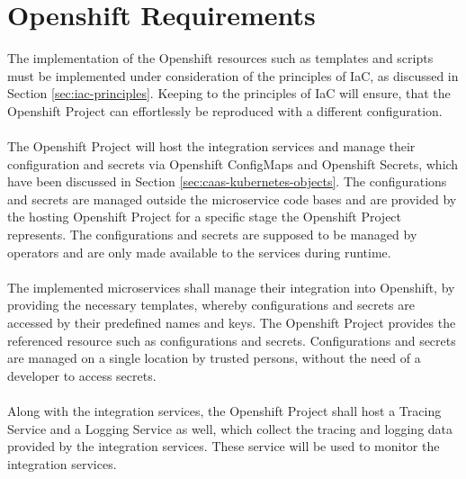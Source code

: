 \section{Openshift Requirements}
\label{sec:esboc-requirements-oc}
The implementation of the Openshift resources such as templates and scripts must be implemented under consideration of the principles of IaC, as discussed in Section \vref{sec:iac-principles}. Keeping to the principles of IaC will ensure, that the Openshift Project can effortlessly be reproduced with a different configuration.  
\\ \\
The Openshift Project will host the integration services and manage their configuration and secrets via Openshift ConfigMaps and Openshift Secrets, which have been discussed in Section \vref{sec:caas-kubernetes-objects}. The configurations and secrets are managed outside the microservice code bases and are provided by the hosting Openshift Project for a specific stage the Openshift Project represents. The configurations and secrets are supposed to be managed by operators and are only made available to the services during runtime.
\\ \\
The implemented microservices shall manage their integration into Openshift, by providing the necessary templates, whereby configurations and secrets are accessed by their predefined names and keys. The Openshift Project provides the referenced resource such as configurations and secrets. Configurations and secrets are managed on a single location by trusted persons, without the need of a developer to access secrets. 
\\ \\
Along with the integration services, the Openshift Project shall host a Tracing Service and a Logging Service as well, which collect the tracing and logging data provided by the integration services. These service will be used to monitor the integration services.

